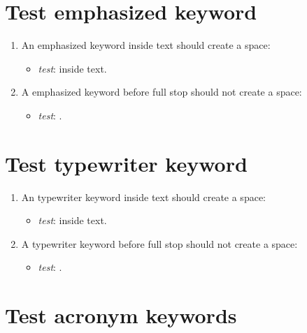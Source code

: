 \section{Test emphasized keyword}

\begin{enumerate}

\item An emphasized keyword inside text should create a space:
\begin{itemize}
\item \textit{test}: \emphKeywordExample inside text.
\end{itemize}

\item A emphasized keyword before full stop should not create a space: 
\begin{itemize}
\item \textit{test}: \emphKeywordExample.
\end{itemize}

\end{enumerate}

\section{Test typewriter keyword}

\begin{enumerate}

\item An typewriter keyword inside text should create a space:
\begin{itemize}
\item \textit{test}: \ttKeywordExample inside text.
\end{itemize}

\item A typewriter keyword before full stop should not create a space: 
\begin{itemize}
\item \textit{test}: \ttKeywordExample.
\end{itemize}

\end{enumerate}

\section{Test acronym keywords}

\acresetall

